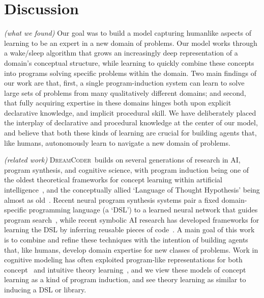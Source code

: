 \documentclass{article}
\newcommand{\system}{\textsc{DreamCoder}~}
\begin{document}
\section{Discussion}

\emph{(what we found)} Our goal was to build a model capturing
humanlike aspects of learning to be an expert in a new domain of
problems. Our model works through a wake/sleep algorithm that grows an increasingly deep
representation of a domain's conceptual structure,
while learning to quickly combine these concepts into programs
solving specific problems within the domain.
Two main findings of our work are that, first, a single
program-induction system can learn to solve large sets of problems
from many qualitatively different domains; and second, that fully
acquiring expertise in these domains hinges both upon explicit
declarative knowledge, and implicit procedural skill.  We have
deliberately placed the interplay of declarative and procedural
knowledge at the center of our model, and believe that both these
kinds of learning are crucial for building agents that, like humans,
autonomously learn to navigate a new domain of problems.

\emph{(related work)} \system builds on several generations of research in AI, program synthesis,
and cognitive science, with program induction being one of the oldest
theoretical frameworks for concept learning within artificial
intelligence~\cite{solomonoff1964formal}, and the conceptually allied
`Language of Thought Hypothesis' being almost as
old~\cite{fodor1975language}. Recent neural program synthesis systems
pair a fixed domain-specific programming language (a `DSL') to a
learned neural network that guides program
search~\cite{DBLP:journals/corr/abs-1804-01118,balog2016deepcoder,devlin2017neural}, while recent
symbolic AI research has developed frameworks for learning the DSL by
inferring reusable pieces of
code~\cite{ecc,Dechter:2013:BLV:2540128.2540316,DBLP:conf/icml/LiangJK10,DBLP:conf/ecai/LinDETM14}.
A main goal of this work is to combine and refine these techniques
with the intention of building agents that, like humans, develop
domain expertise for new classes of problems.  Work in cognitive
modeling has often exploited program-like representations for both
concept~\cite{piantadosi2011learning,lake2015human,GoodmanEtAl2015-Chapter} and intuitive theory
learning~\cite{logical,Ullman2012},
and we view these models of concept learning as
a kind of program induction,
and see theory learning as similar to inducing a DSL or library.
\end{document}
